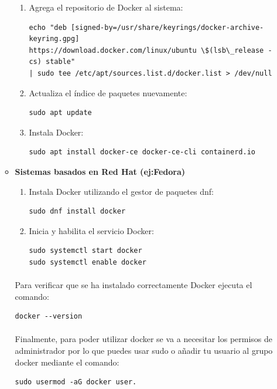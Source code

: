 \begin{itemize}
\begin{itemize}
\begin{enumerate}
            \item Agrega el repositorio de Docker al sistema:
            \begin{lstlisting}[frame=single, basicstyle=\tiny]
echo "deb [signed-by=/usr/share/keyrings/docker-archive-keyring.gpg]
https://download.docker.com/linux/ubuntu \$(lsb\_release -cs) stable"
| sudo tee /etc/apt/sources.list.d/docker.list > /dev/null
            \end{lstlisting}
            
            \item Actualiza el índice de paquetes nuevamente:
           \begin{lstlisting}[frame=single, basicstyle=\small]
sudo apt update
            \end{lstlisting}
            \item Instala Docker:
            \begin{lstlisting}[frame=single, basicstyle=\small]
sudo apt install docker-ce docker-ce-cli containerd.io
            \end{lstlisting}
        \end{enumerate}
        \item \textbf{Sistemas basados en Red Hat (ej:Fedora)}
        \begin{enumerate}
            \item Instala Docker utilizando el gestor de paquetes dnf:
            \begin{lstlisting}[frame=single, basicstyle=\small]
sudo dnf install docker
            \end{lstlisting}
            \item Inicia y habilita el servicio Docker:
            \begin{lstlisting}[frame=single, basicstyle=\small]
sudo systemctl start docker
sudo systemctl enable docker
            \end{lstlisting}
        \end{enumerate}
        \paragraph{}
        Para verificar que se ha instalado correctamente Docker ejecuta el comando:
        \begin{lstlisting}[frame=single, basicstyle=\small]
docker --version
        \end{lstlisting}
        \paragraph{}
             Finalmente, para poder utilizar docker se va a necesitar los permisos de administrador por lo que puedes usar sudo o añadir tu usuario al grupo docker mediante el comando:
              \begin{lstlisting}[frame=single, basicstyle=\small]
sudo usermod -aG docker user.
        \end{lstlisting}
    \end{itemize}
\end{itemize}
\newpage
